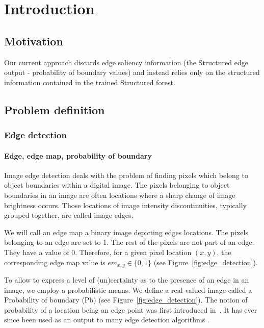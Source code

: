 \chapter{Introduction}
\label{Chapter1}
\section{Motivation}

Our current approach discards edge saliency information (the Structured edge~\cite{DollarICCV13edges} output - probability of boundary values) and instead relies only on the structured information contained in the trained Structured forest.

\section{Problem definition}
\subsection{Edge detection}

\subsubsection*{Edge, edge map, probability of boundary}
Image edge detection deals with the problem of finding pixels which belong to object boundaries within a digital image. The pixels belonging to object boundaries in an image are often locations where a sharp change of image brightness occurs. Those locations of image intensity discontinuities, typically grouped together, are called image edges.

We will call an edge map a binary image depicting edges locations. The pixels belonging to an edge are set to 1. The rest of the pixels are not part of an edge. They have a value of 0. Therefore, for a given pixel location $(x,y)$, the corresponding edge map value is $em_{x,y} \in \{0,1\}$ (see Figure~\ref{fig:edge_detection}).

To allow to express a level of (un)certainty as to the presence of an edge in an image, we employ a probabilistic means. We define a real-valued image called a Probability of boundary (Pb) (see Figure~\ref{fig:edge_detection}). The notion of probability of a location being an edge point was first introduced in~\cite{martin2004learning}. It has ever since been used as an output to many edge detection algorithms \cite{Maire2008using}.


